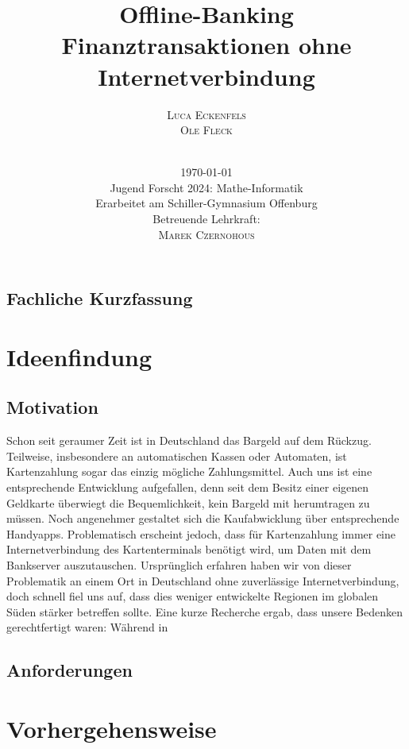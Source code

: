 \documentclass[a4paper,12pt,ngerman]{scrreport}
\title{Offline-Banking\\
    \vspace{6mm}
    \large{Finanztransaktionen ohne Internetverbindung}}
\author{\Large{\textsc{Luca Eckenfels}}\\\textsc{Ole Fleck}\\
    \vspace{5cm}\\
\date{\today\\\vspace{12mm}
Jugend Forscht 2024: Mathe-Informatik\\\vspace{6mm}
    Erarbeitet am Schiller-Gymnasium Offenburg\\
Betreuende Lehrkraft: \\\textsc{Marek Czernohous}}
}
\begin{document}


    \maketitle
    \tableofcontents
    \newpage
    \section*{Fachliche Kurzfassung}

    \chapter{Ideenfindung}\label{ch:einleitung}
    \section{Motivation}
    Schon seit geraumer Zeit ist in Deutschland das Bargeld auf dem Rückzug.
    Teilweise, insbesondere an automatischen Kassen oder Automaten, ist Kartenzahlung sogar das einzig mögliche Zahlungsmittel.
    Auch uns ist eine entsprechende Entwicklung aufgefallen, denn seit dem Besitz einer eigenen Geldkarte überwiegt die Bequemlichkeit, kein Bargeld mit herumtragen zu müssen.
    Noch angenehmer gestaltet sich die Kaufabwicklung über entsprechende Handyapps.
    Problematisch erscheint jedoch, dass für Kartenzahlung immer eine Internetverbindung des Kartenterminals benötigt wird, um Daten mit dem Bankserver auszutauschen.
    Ursprünglich erfahren haben wir von dieser Problematik an einem Ort in Deutschland ohne zuverlässige Internetverbindung, doch schnell fiel uns auf, dass dies weniger entwickelte Regionen im globalen Süden stärker betreffen sollte.
    Eine kurze Recherche ergab, dass unsere Bedenken gerechtfertigt waren:
    Während in

    \section{Anforderungen}

    \chapter{Vorhergehensweise}\label{ch:umsetzung}
\end{document}
